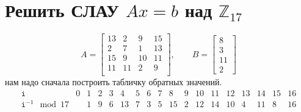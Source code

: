 \documentclass{article}
\newcommand{\Z}{\mathbb{Z}}
\begin{document}
  \section{Решить СЛАУ $Ax = b$ над $\Z_{17}$}
  \[
    A=\begin{bmatrix}
      13 & 2 & 9 & 15 \\
      2 & 7 & 1 & 13 \\
      15 & 9 & 10 & 11 \\
      11 & 11 & 2 & 9 \\
    \end{bmatrix},\qquad
    B=\begin{bmatrix}8\\3\\11\\2\end{bmatrix}
  \]
  нам надо сначала построить табличку обратных значений.
  \[
    \begin{array}{c|ccccccccccccccccc}
      \texttt{i} & 0 & 1 & 2 & 3 & 4 & 5 & 6 & 7 & 8 & 9 & 10 & 11 & 12 & 13 & 14 & 15 & 16 \\
      \hline
      \texttt{i}^{-1} \mod 17 & & 1 & 9 & 6 & 13 & 7 & 3 & 5 & 15 & 2 & 12 & 14 & 10 & 4 & 11 & 8 & 16 \\
    \end{array}
  \]
\end{document}
